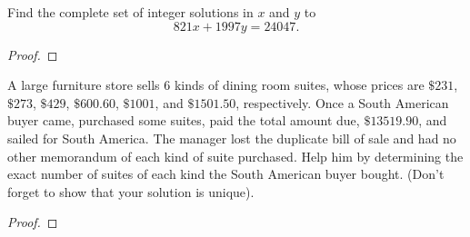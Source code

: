 \documentclass[10pt]{amsart}
\begin{document}
\begin{thm}\label{ex4}
  Find the complete set of integer solutions in $x$ and $y$ to
  $$821x + 1997y = 24047.$$

  \begin{proof}
  \end{proof}
\end{thm}

\begin{thm}\label{ex5}
  A large furniture store sells 6 kinds of dining room suites, whose prices are $\$231$, $\$273$, $\$429$, $\$600.60$, $\$1001$, and $\$1501.50$, respectively.
  Once a South American buyer came, purchased some suites, paid the total amount due, $\$13519.90$, and sailed for South America.
  The manager lost the duplicate bill of sale and had no other memorandum of each kind of suite purchased.
  Help him by determining the exact number of suites of each kind the South American buyer bought.
  (Don't forget to show that your solution is unique).
  \begin{proof}
  \end{proof}
\end{thm}
\end{document}
